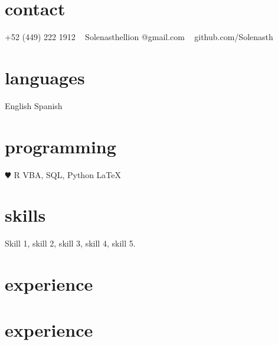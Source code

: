 \documentclass[]{cv-style}          %
\begin{document}

\lastupdated


\begin{aside}
%
\section{contact}
+52 (449) 222 1912
~
Solenasthellion
@gmail.com
~
github.com/Solenasth
%
\section{languages}
English
Spanish
%
\section{programming}
{\color{red} $\varheartsuit$} R
VBA, SQL, Python
\LaTeX{}
%
\end{aside}


\section{skills}
\vspace{-0.2cm}

Skill 1, skill 2, skill 3, skill 4, skill 5.


\section{experience}
\section{experience}
\end{document}

